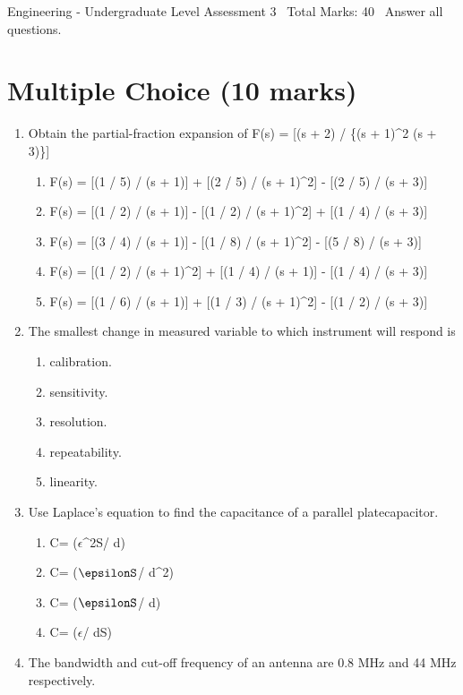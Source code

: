 \documentclass[12pt]{article}
\begin{document}
\begin{center}
Engineering - Undergraduate Level Assessment 3 \
Total Marks: 40 \
Answer all questions.
\end{center}

\section*{Multiple Choice (10 marks)}
\begin{enumerate}[label=\arabic*.]
\item Obtain the partial-fraction expansion of F(s) = [(s + 2) / \{(s + 1)\^{}2 (s + 3)\}]
\begin{enumerate}[label=(\alph*)]
    \item F(s) = [(1 / 5) / (s + 1)] + [(2 / 5) / (s + 1)\^{}2] - [(2 / 5) / (s + 3)]
    \item F(s) = [(1 / 2) / (s + 1)] - [(1 / 2) / (s + 1)\^{}2] + [(1 / 4) / (s + 3)]
    \item F(s) = [(3 / 4) / (s + 1)] - [(1 / 8) / (s + 1)\^{}2] - [(5 / 8) / (s + 3)]
    \item F(s) = [(1 / 2) / (s + 1)\^{}2] + [(1 / 4) / (s + 1)] - [(1 / 4) / (s + 3)]
    \item F(s) = [(1 / 6) / (s + 1)] + [(1 / 3) / (s + 1)\^{}2] - [(1 / 2) / (s + 3)]
\end{enumerate}
\item The smallest change in measured variable to which instrument will respond is
\begin{enumerate}[label=(\alph*)]
    \item calibration.
    \item sensitivity.
    \item resolution.
    \item repeatability.
    \item linearity.
\end{enumerate}
\item Use Laplace's equation to find the capacitance of a parallel platecapacitor.
\begin{enumerate}[label=(\alph*)]
    \item C= (\ensuremath{\epsilon}\^{}2S/ d)
    \item C= (\ensuremath{\epsilonS}/ d\^{}2)
    \item C= (\ensuremath{\epsilonS}/ d)
    \item C= (\ensuremath{\epsilon}/ dS)
\end{enumerate}
\item The bandwidth and cut-off frequency of an antenna are 0.8 MHz and 44 MHz respectively.

\end{enumerate}
\end{document}
